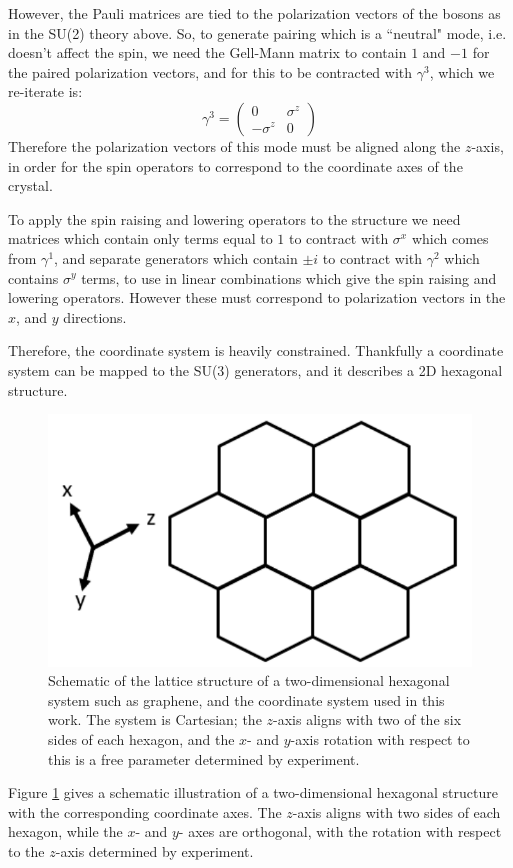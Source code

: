 \documentclass[prb,showpacs,superscriptaddress,titlepage,amsmath,amssymb,twocolumn]{revtex4-1}
\begin{document}
However, the Pauli matrices are tied to the polarization vectors of the bosons as in the SU(2) theory above. So, to generate pairing which is a ``neutral" mode, i.e. doesn't affect the spin, we need the Gell-Mann matrix to contain $1$ and $-1$ for the paired polarization vectors, and for this to be contracted with $\gamma^{3}$, which we re-iterate is:
\begin{equation}
\gamma^{3} = \begin{pmatrix}0&\sigma^{z}\\-\sigma^{z}& 0\end{pmatrix}
\end{equation} 
Therefore the polarization vectors of this mode must be aligned along the $z$-axis, in order for the spin operators to correspond to the coordinate axes of the crystal.

To apply the spin raising and lowering operators to the structure we need matrices which contain only terms equal to $1$ to contract with $\sigma^{x}$ which comes from $\gamma^{1}$, and separate generators which contain $\pm i$ to contract with $\gamma^{2}$ which contains $\sigma^{y}$ terms, to use in linear combinations which give the spin raising and lowering operators. However these must correspond to polarization vectors in the $x$, and $y$ directions.

Therefore, the coordinate system is heavily constrained. Thankfully a coordinate system can be mapped to the SU(3) generators, and it describes a 2D hexagonal structure. 
\begin{figure}
\includegraphics[width=0.8\columnwidth]{Graphene_Lattice}
\caption{Schematic of the lattice structure of a two-dimensional hexagonal system such as graphene, and the coordinate system used in this work. The system is Cartesian; the $z$-axis aligns with two of the six sides of each hexagon, and the $x$- and $y$-axis rotation with respect to this is a free parameter determined by experiment.}
\label{Graphene}
\end{figure}
Figure \ref{Graphene} gives a schematic illustration of a two-dimensional hexagonal structure with the corresponding coordinate axes. The $z$-axis aligns with two sides of each hexagon, while the $x$- and $y$- axes are orthogonal, with the rotation with respect to the $z$-axis determined by experiment.
\end{document}
